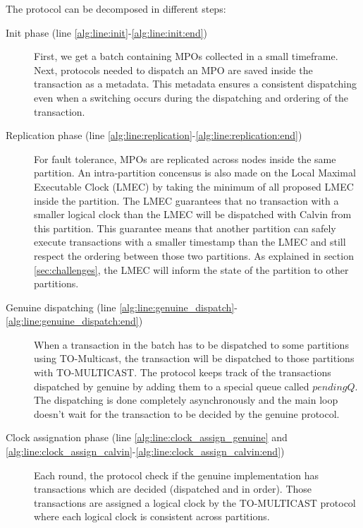 \documentclass[a4paper, 10pt]{article}
\newcommand{\GE}{TO-Multicast}
\newcommand{\PE}{Calvin}
\begin{document}
The protocol can be decomposed in different steps:

\begin{description}
    \item[Init phase (line \ref{alg:line:init}-\ref{alg:line:init:end})] First, we get a batch containing MPOs collected in
        a small timeframe. Next, protocols needed to dispatch an MPO are saved inside the transaction as a metadata.
        This metadata ensures a consistent dispatching even when a switching occurs during the dispatching and ordering
        of the transaction.

    \item[Replication phase (line \ref{alg:line:replication}-\ref{alg:line:replication:end})]
        For fault tolerance, MPOs are replicated across nodes inside the same
        partition. An intra-partition concensus is also made on the Local
        Maximal Executable Clock (LMEC) by taking the minimum of all proposed
        LMEC inside the partition. The LMEC guarantees that no transaction with a
        smaller logical clock than the LMEC will be dispatched with \PE{} from this partition.
        This guarantee means that another partition can safely execute transactions
        with a smaller timestamp than the LMEC and still respect the ordering between those
        two partitions. As explained in section \ref{sec:challenges}, the LMEC will inform
        the state of the partition to other partitions.

    \item[Genuine dispatching (line \ref{alg:line:genuine_dispatch}-\ref{alg:line:genuine_dispatch:end})]
        When a transaction in the batch has to be dispatched to some partitions using \GE, the transaction will be dispatched
        to those partitions with TO-MULTICAST. The protocol keeps track of the transactions dispatched by genuine
        by adding them to a special queue
        called $pendingQ$. The dispatching is done completely asynchronously and the main loop
        doesn't wait for the transaction to be decided by the genuine protocol.

    \item[Clock assignation phase (line \ref{alg:line:clock_assign_genuine} and \ref{alg:line:clock_assign_calvin}-\ref{alg:line:clock_assign_calvin:end})]
        Each round, the protocol check if the genuine implementation has transactions which are decided (dispatched and
        in order). Those transactions are assigned a logical clock by the TO-MULTICAST protocol
        where each logical clock is consistent across partitions.


\end{description}
\end{document}
